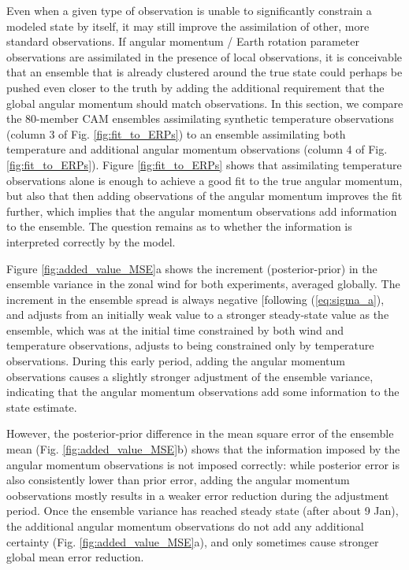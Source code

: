 Even when a given type of observation is unable to significantly constrain a modeled state by itself, it may still improve the assimilation of other, more standard observations.  
If angular momentum / Earth rotation parameter observations are assimilated in the presence of local observations, it is conceivable that an ensemble that is already clustered around the true state could perhaps be pushed even closer to the truth by adding the additional requirement that the global angular momentum should match observations. 
In this section, we compare the 80-member CAM ensembles assimilating synthetic temperature observations (column 3 of Fig. \ref{fig:fit_to_ERPs}) to an ensemble assimilating both temperature and additional angular momentum observations (column 4 of Fig. \ref{fig:fit_to_ERPs}).
Figure \ref{fig:fit_to_ERPs} shows that assimilating 
temperature observations alone is enough to achieve a good fit to the true angular momentum, but also that 
then adding observations of the angular momentum improves the fit further, which implies that  
the angular momentum observations add information to the ensemble. 
The question remains as to whether the information is interpreted correctly by the model.

Figure \ref{fig:added_value_MSE}a shows the increment (posterior-prior) in the ensemble variance in the zonal wind for both experiments, averaged globally. 
The increment in the ensemble spread is always negative [following (\ref{eq:sigma_a}), and adjusts from an initially weak value to a stronger steady-state value as the ensemble, which was at the initial time constrained by both wind and temperature observations, adjusts to being constrained only by temperature observations. 
During this early period, adding the angular momentum observations causes a slightly stronger adjustment of the ensemble variance, indicating that the angular momentum observations add some information to the state estimate. 

However, the posterior-prior difference in the mean square error of the ensemble mean (Fig. \ref{fig:added_value_MSE}b) shows that the information imposed by the angular momentum observations is not imposed correctly: while posterior error is also consistently lower than prior error, adding the angular momentum oobservations mostly results in a weaker error reduction during the adjustment period. 
Once the ensemble variance has reached steady state (after about 9 Jan), the additional angular momentum observations do not add any additional certainty (Fig. \ref{fig:added_value_MSE}a), and only sometimes cause stronger global mean error reduction. 


